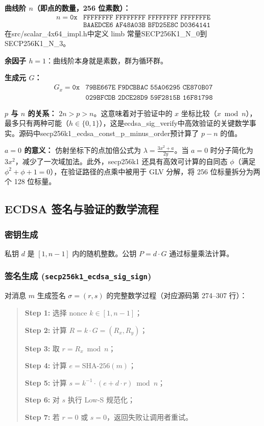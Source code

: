 \documentclass[a4paper,12pt]{ctexart}
\begin{document}
\textbf{曲线阶 $n$（即点的数量，256 位素数）：}
\begin{align*}
n = \texttt{0x} &\texttt{FFFFFFFF FFFFFFFF FFFFFFFF FFFFFFFE} \\
                &\texttt{BAAEDCE6 AF48A03B BFD25E8C D0364141}
\end{align*}
在src/scalar\_4x64\_impl.h中定义 limb 常量SECP256K1\_N\_0到SECP256K1\_N\_3。

\textbf{余因子 $h = 1$}：曲线阶本身就是素数，群为循环群。

\textbf{生成元 $G$：}
\begin{align*}
G_x = \texttt{0x} &\texttt{79BE667E F9DCBBAC 55A06295 CE870B07} \\
                  &\texttt{029BFCDB 2DCE28D9 59F2815B 16F81798}
\end{align*}

\textbf{$p$ 与 $n$ 的关系：} $2n > p > n$。这意味着对于验证中的 $x$ 坐标比较（$x \bmod n$），最多只有两种可能（$h \in \{0, 1\}$），这是ecdsa\_sig\_verify中高效验证的关键数学事实。源码中secp256k1\_ecdsa\_const\_p\_minus\_order预计算了 $p-n$ 的值。

\textbf{$a=0$ 的意义：} 仿射坐标下的点加倍公式为 $\lambda = \frac{3x^2 + a}{2y}$。当 $a=0$ 时分子简化为 $3x^2$，减少了一次域加法。此外，secp256k1 还具有高效可计算的自同态 $\phi$（满足 $\phi^2 + \phi + 1 = 0$），在验证路径的点乘中被用于 GLV 分解，将 256 位标量拆分为两个 128 位标量。

\subsection{ECDSA 签名与验证的数学流程}

\subsubsection{密钥生成}

私钥 $d$ 是 $[1, n-1]$ 内的随机整数。公钥 $P = d \cdot G$ 通过标量乘法计算。

\subsubsection{签名生成 (\texttt{secp256k1\_ecdsa\_sig\_sign})}

对消息 $m$ 生成签名 $\sigma = (r, s)$ 的完整数学过程（对应源码第 274--307 行）：

\begin{quote}
\textbf{Step 1:} 选择 nonce $k \in [1, n-1]$；

\textbf{Step 2:} 计算 $R = k \cdot G = (R_x, R_y)$；

\textbf{Step 3:} 取 $r = R_x \bmod n$；

\textbf{Step 4:} 计算 $e = \text{SHA-256}(m)$；

\textbf{Step 5:} 计算 $s = k^{-1} \cdot (e + d \cdot r) \bmod n$；

\textbf{Step 6:} 对 $s$ 执行 Low-S 规范化；

\textbf{Step 7:} 若 $r = 0$ 或 $s = 0$，返回失败让调用者重试。
\end{quote}
\end{document}

